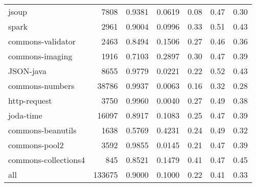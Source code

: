 \begin{table*}
\begin{tabular}{lrrrrrr}
                  jsoup &    7808 &          0.9381 &          0.0619 &         0.08 &         0.47 &             0.30 \\
                  spark &    2961 &          0.9004 &          0.0996 &         0.33 &         0.51 &             0.43 \\
      commons-validator &    2463 &          0.8494 &          0.1506 &         0.27 &         0.46 &             0.36 \\
        commons-imaging &    1916 &          0.7103 &          0.2897 &         0.30 &         0.47 &             0.39 \\
              JSON-java &    8655 &          0.9779 &          0.0221 &         0.22 &         0.52 &             0.43 \\
        commons-numbers &   38786 &          0.9937 &          0.0063 &         0.16 &         0.32 &             0.28 \\
           http-request &    3750 &          0.9960 &          0.0040 &         0.27 &         0.49 &             0.38 \\
              joda-time &   16097 &          0.8917 &          0.1083 &         0.25 &         0.47 &             0.39 \\
      commons-beanutils &    1638 &          0.5769 &          0.4231 &         0.24 &         0.49 &             0.32 \\
          commons-pool2 &    3592 &          0.9855 &          0.0145 &         0.21 &         0.47 &             0.39 \\
   commons-collections4 &     845 &          0.8521 &          0.1479 &         0.41 &         0.47 &             0.45 \\
                    all &  133675 &          0.9000 &          0.1000 &         0.22 &         0.41 &             0.33 \\
\bottomrule
\end{tabular}
\end{table*}
